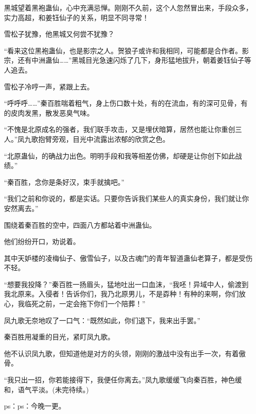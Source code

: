 \begin{this_body}
黑城望着黑袍蛊仙，心中充满忌惮。刚刚不久前，这个人忽然冒出来，手段众多，实力高超，和姜钰仙子的关系，明显不同寻常！

雪松子犹豫，他黑城又何尝不犹豫？

“看来这位黑袍蛊仙，也是影宗之人。贺狼子或许和我相同，可能都是合作者。影宗，还有中洲蛊仙……”黑城目光急速闪烁了几下，身形猛地拔升，朝着姜钰仙子等人追去。

雪松子冷哼一声，紧跟上去。

“呼呼呼……”秦百胜喘着粗气，身上伤口数十处，有的在流血，有的深可见骨，有的皮肉发黑，散发恶臭气味。

“不愧是北原成名的强者，我们联手攻击，又是埋伏暗算，居然也能让你重创三人。”凤九歌抱臂旁观，目光中流露出浓郁的欣赏之色。

“北原蛊仙，的确战力出色。明明手段和我等相差仿佛，却硬是让你创下如此战绩。”

“秦百胜，念你是条好汉，束手就擒吧。”

“我们之前和你说的，都是实话。只要你告诉我们某些人的真实身份，我们就让你安然离去。”

围绕着秦百胜的空中，四面八方都站着中洲蛊仙。

他们纷纷开口，劝说着。

其中天妒楼的凌梅仙子、傲雪仙子，以及古魂门的青年智道蛊仙老算子，都是受伤不轻。

“想要我投降？”秦百胜一扬眉头，猛地吐出一口血沫，“我呸！异域中人，偷渡到我北原来。入侵者！告诉你们，我乃北原男儿，不是孬种！有种的来啊，你们放心，我临死之前，一定会拖下你们一个陪葬！”

凤九歌无奈地叹了一口气：“既然如此，你们退下，我来出手罢。”

秦百胜用凝重的目光，紧盯凤九歌。

他不认识凤九歌，但知道他是对方的头领，刚刚的激战中没有出手一次，有着傲骨。

“我只出一招，你若能接得下，我便任你离去。”凤九歌缓缓飞向秦百胜，神色缓和，语气平淡。(未完待续。)

ps：ps：今晚一更。

\end{this_body}

